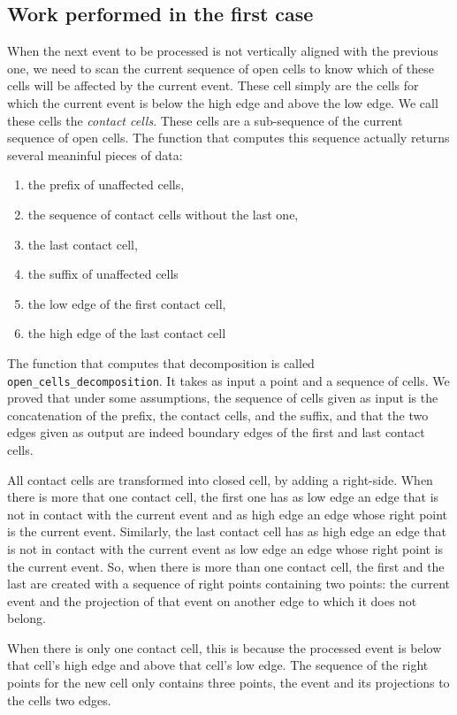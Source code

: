 \documentclass[a4paper, USenglish, cleveref, autoref, thm-restate]{lipics-v2021}
\begin{document}
\subsection{Work performed in the first case}
When the next event to be processed is not vertically aligned with the
previous one, we need to scan the current sequence of open cells to
know which of these cells will be affected by the current event.
These cell simply are the cells for which the current event is below
the high edge and above the low edge.  We call these cells the {\em
  contact cells}.  These cells are a sub-sequence
of the current sequence of open cells.  The function that computes
this sequence actually returns several meaninful pieces of data:
\begin{enumerate}
\item the prefix of unaffected cells,
\item the sequence of contact cells without the last one,
\item the last contact cell,
\item the suffix of unaffected cells
\item the low edge of the first contact cell,
\item the high edge of the last contact cell
\end{enumerate}
The function that computes that decomposition is called
{\tt open\_cells\_decomposition}.  It takes as input a point and a
sequence of cells.  We proved that under some assumptions, the
sequence of cells given as input is the concatenation of the prefix,
the contact cells, and the suffix, and that the two edges given as
output are indeed boundary edges of the first and last contact cells.

All contact cells are transformed into closed cell, by adding a
right-side.  When there is more that one contact cell, the first one
has as low edge an edge that is not in contact with the current event
and as high edge an edge whose right point is the current event.
Similarly, the last contact cell has as high edge an edge that is not
in contact with the current event as low edge an edge whose right
point is the current event.  So, when there is more than one contact
cell, the first and the last are created with a sequence of right
points containing two points: the current event and the projection of
that event on another edge to which it does not belong.

When there is only one contact cell, this is because the processed
event is below that cell's high edge and above that cell's low edge.
The sequence of the right points for the new cell only contains three
points, the event and its projections to the cells two edges.
\end{document}
